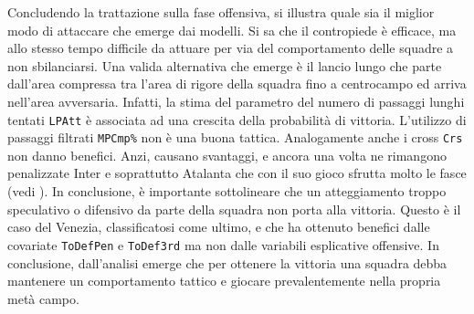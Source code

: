 Concludendo la trattazione sulla fase offensiva, si illustra quale sia il miglior modo di attaccare che emerge dai modelli. Si sa che il contropiede è efficace, ma allo stesso tempo difficile da attuare per via del comportamento delle squadre a non sbilanciarsi. Una valida alternativa che emerge è il lancio lungo che parte dall'area compressa tra l'area di rigore della squadra fino a centrocampo ed arriva nell'area avversaria. Infatti, la stima del parametro del numero di passaggi lunghi tentati \texttt{LPAtt} è associata ad una crescita della probabilità di vittoria. L'utilizzo di passaggi filtrati \texttt{MPCmp\%} non è una buona tattica. Analogamente anche i cross \texttt{Crs} non danno benefici. Anzi, causano svantaggi, e ancora una volta ne rimangono penalizzate Inter e soprattutto Atalanta che con il suo gioco sfrutta molto le fasce (vedi \textit{\cite{ataGioco}}). In conclusione, è importante sottolineare che un atteggiamento troppo speculativo o difensivo da parte della squadra non porta alla vittoria. Questo è il caso del Venezia, classificatosi come ultimo, e che ha ottenuto benefici dalle covariate \texttt{ToDefPen} e \texttt{ToDef3rd} ma non dalle variabili esplicative offensive. In conclusione, dall'analisi emerge che per ottenere la vittoria una squadra debba mantenere un comportamento tattico e giocare prevalentemente nella propria metà campo.

